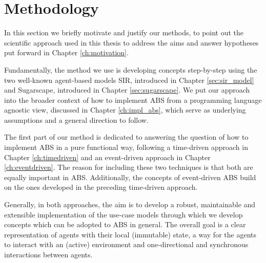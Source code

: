 \chapter{Methodology}
\label{ch:methodology}


In this section we briefly motivate and justify our methods, to point out the scientific approach used in this thesis to address the aims and answer hypotheses put forward in Chapter \ref{ch:motivation}.

Fundamentally, the method we use is developing concepts step-by-step using the two well-known agent-based models SIR, introduced in Chapter \ref{sec:sir_model} and Sugarscape, introduced in Chapter \ref{sec:sugarscape}. We put our approach into the broader context of how to implement ABS from a programming language agnostic view, discussed in Chapter \ref{ch:impl_abs}, which serve as underlying assumptions and a general direction to follow.

The first part of our method is dedicated to answering the question of how to implement ABS in a pure functional way, following a time-driven approach in Chapter \ref{ch:timedriven} and an event-driven approach in Chapter \ref{ch:eventdriven}. The reason for including these two techniques is that both are equally important in ABS. Additionally, the concepts of event-driven ABS build on the ones developed in the preceding time-driven approach.

Generally, in both approaches, the aim is to develop a robust, maintainable and extensible implementation of the use-case models through which we develop concepts which can be adopted to ABS in general. The overall goal is a clear representation of agents with their local (immutable) state, a way for the agents to interact with an (active) environment and one-directional and synchronous interactions between agents. 

